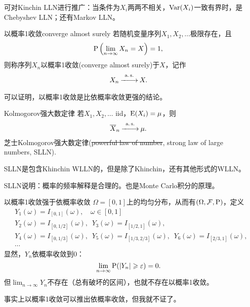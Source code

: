 可对Kinchin LLN进行推广：当条件为$X_i$两两不相关，$\Var(X_i)$一致有界时，是Chebyshev LLN；还有Markov LLN。
\begin{definition}{以概率1收敛}{converge almost surely}
	若随机变量序列$X_1,X_2,\ldots$极限存在，且
	\begin{align}
		\P\kh{\lim_{n\to\infty}X_n=X}=1,
	\end{align}
	则称序列$X_n$以概率1收敛(converge almost surely)于$X$，记作
	\begin{align}
		X_n\asto X.
	\end{align}
\end{definition}
可以证明，以概率1收敛是比依概率收敛更强的结论。
\begin{theorem}{Kolmogorov强大数定律}{}
	若$X_1,X_2,\ldots$ iid，$\E(X_i)=\mu$，则 
	\begin{align}
		\avg X_n\asto\mu.
	\end{align}
	芝士Kolmogorov强大数定律(\sout{powerful law of number}, strong law of large numbers, SLLN).
\end{theorem}
SLLN是包含Khinchin WLLN的，但是除了Khinchin，还有其他形式的WLLN。

SLLN说明：概率的频率解释是合理的。也是Monte Carlo积分的原理。

\begin{example}{以概率1收敛强于依概率收敛}{}
	$\Omega=[0,1]$上的均匀分布，从而有$(\Omega,\cF,\P)$，定义
	\begin{align*}
		&Y_1(\omega)=I_{[0,1]}(\omega),\quad\omega\in[0,1]\\
		&Y_2(\omega)=I_{[0,1/2]}(\omega),\enspace Y_3(\omega)=I_{[1/2,1]}(\omega),\\
		&Y_4(\omega)=I_{[0,1/3]}(\omega),\enspace Y_5(\omega)=I_{[1/3,2/3]}(\omega),\enspace Y_6(\omega)=I_{[2/3,1]}(\omega),\\
		&\cdots
	\end{align*}
	显然，$Y_n$依概率收敛到0：
	\[
		\lim_{n\to\infty}\P(|Y_n|\geqslant\varepsilon)=0.
	\]
	但$\lim_{n\to\infty}Y_n$不存在（总有破坏的区间），也就不存在以概率1收敛。
\end{example}
事实上以概率1收敛可以推出依概率收敛，但我就不证了。
